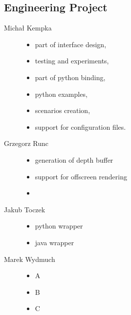 	\subsection{Engineering Project}
	\begin{description}
		\item[Michał Kempka] \hfill
			\begin{itemize}
				\item part of interface design,
				\item testing and experiments,
				\item part of python binding,
				\item python examples,
				\item scenarios creation,
				\item support for configuration files.
			\end{itemize}
		\item[Grzegorz Runc] \hfill
			\begin{itemize}
				\item generation of depth buffer
				\item support for offscreen rendering
                \item
			\end{itemize}
		\item[Jakub Toczek] \hfill
			\begin{itemize}
				\item python wrapper
				\item java wrapper
			\end{itemize}
		\item[Marek Wydmuch] \hfill
			\begin{itemize}
				\item A
				\item B
				\item C
			\end{itemize}
	\end{description}
	
   	
